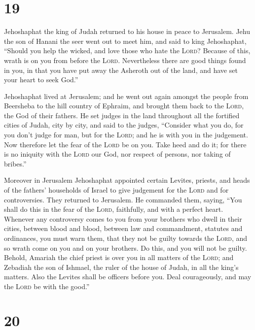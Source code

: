 \hypertarget{section-18}{%
\section{19}\label{section-18}}

 Jehoshaphat the king of Judah returned to his house in
peace to Jerusalem.  Jehu the son of Hanani the seer went
out to meet him, and said to king Jehoshaphat, ``Should you help the
wicked, and love those who hate the \textsc{Lord}? Because of this,
wrath is on you from before the \textsc{Lord}. 
Nevertheless there are good things found in you, in that you have put
away the Asheroth out of the land, and have set your heart to seek
God.''

 Jehoshaphat lived at Jerusalem; and he went out again
amongst the people from Beersheba to the hill country of Ephraim, and
brought them back to the \textsc{Lord}, the God of their fathers.
 He set judges in the land throughout all the fortified
cities of Judah, city by city,  and said to the judges,
``Consider what you do, for you don't judge for man, but for the
\textsc{Lord}; and he is with you in the judgement.  Now
therefore let the fear of the \textsc{Lord} be on you. Take heed and do
it; for there is no iniquity with the \textsc{Lord} our God, nor respect
of persons, nor taking of bribes.''

 Moreover in Jerusalem Jehoshaphat appointed certain
Levites, priests, and heads of the fathers' households of Israel to give
judgement for the \textsc{Lord} and for controversies. They returned to
Jerusalem.  He commanded them, saying, ``You shall do this
in the fear of the \textsc{Lord}, faithfully, and with a perfect heart.
 Whenever any controversy comes to you from your brothers
who dwell in their cities, between blood and blood, between law and
commandment, statutes and ordinances, you must warn them, that they not
be guilty towards the \textsc{Lord}, and so wrath come on you and on
your brothers. Do this, and you will not be guilty. 
Behold, Amariah the chief priest is over you in all matters of the
\textsc{Lord}; and Zebadiah the son of Ishmael, the ruler of the house
of Judah, in all the king's matters. Also the Levites shall be officers
before you. Deal courageously, and may the \textsc{Lord} be with the
good.''

\hypertarget{section-19}{%
\section{20}\label{section-19}}

